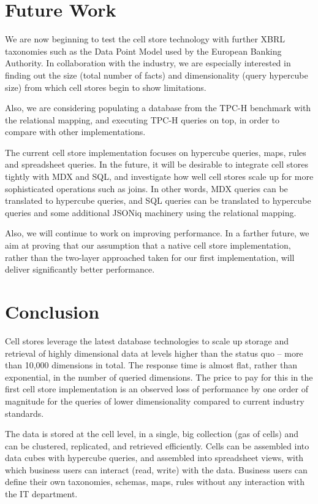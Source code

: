 \documentclass{acm_proc_article-sp}
\begin{document}
\section{Future Work}

We are now beginning to test the cell store technology with further XBRL taxonomies such as the Data Point Model used by the European Banking Authority. In collaboration with the industry, we are especially interested in finding out the size (total number of facts) and dimensionality (query hypercube size) from which cell stores begin to show limitations.

Also, we are considering populating a database from the TPC-H benchmark with the relational mapping, and executing TPC-H queries on top, in order to compare with other implementations.

The current cell store implementation focuses on hypercube queries, maps, rules and spreadsheet queries. In the future, it will be desirable to integrate cell stores tightly with MDX and SQL, and investigate how well cell stores scale up for more sophisticated operations such as joins. In other words, MDX queries can be translated to hypercube queries, and SQL queries can be translated to hypercube queries and some additional JSONiq machinery using the relational mapping.

Also, we will continue to work on improving performance. In a farther future, we aim at proving that our assumption that a native cell store implementation, rather than the two-layer approached taken for our first implementation, will deliver significantly better performance.

\section{Conclusion}

Cell stores leverage the latest database technologies to scale up storage and retrieval of highly dimensional data at levels higher than the status quo -- more than 10,000 dimensions in total. The response time is almost flat, rather than exponential, in the number of queried dimensions. The price to pay for this in the first cell store implementation is an observed loss of performance by one order of magnitude for the queries of lower dimensionality compared to current industry standards. 

The data is stored at the cell level, in a single, big collection (gas of cells) and can be clustered, replicated, and retrieved efficiently. Cells can be assembled into data cubes with hypercube queries, and assembled into spreadsheet views, with which business users can interact (read, write) with the data. Business users can define their own taxonomies, schemas, maps, rules without any interaction with the IT department.
\end{document}
